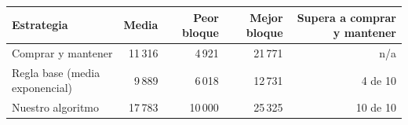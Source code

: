 \begin{tabular}{lrrrr}
\toprule
Estrategia & Media & Peor bloque & Mejor bloque & Supera a comprar y mantener \\
\midrule
Comprar y mantener & 11\,316 & 4\,921 & 21\,771 & n/a \\
Regla base (media exponencial) & 9\,889 & 6\,018 & 12\,731 & 4 de 10 \\
Nuestro algoritmo & 17\,783 & 10\,000 & 25\,325 & 10 de 10 \\
\bottomrule
\end{tabular}

